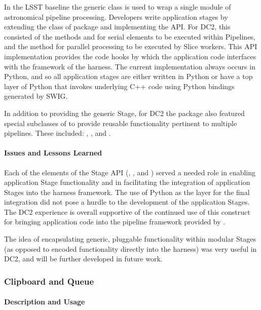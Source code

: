 In the LSST baseline the generic class  is used to wrap a single module of 
astronomical pipeline processing.  Developers write application stages by extending the 
 class of  package  and implementing the  API. 
For DC2, this  consisted of the  methods  and  for 
serial elements to be executed within Pipelines, and the
 method for parallel processing to be executed by Slice workers. 
This API implementation provides the code hooks by which the application code interfaces with 
the framework of the harness. The current  implementation always occurs in Python, and 
so all application stages are either written in Python or have a top layer of Python that 
invokes underlying C++ code using Python bindings generated by SWIG.  

In addition to providing the generic Stage, for DC2 the  package also
featured  special subclasses  of  to provide reusable functionality pertinent  to  
multiple pipelines. These included: 
, , and .

\paragraph{Issues and Lessons Learned}

Each of the elements of the Stage API (, , and  ) 
served a needed role in enabling application Stage functionality and in facilitating the
integration of application Stages into the harness framework. The use of Python as the layer for
the final integration did not pose a hurdle to the development of the application Stages. 
The DC2 experience is overall  supportive of the  continued use of this construct for bringing 
application code  into the  pipeline  framework provided by . 


The idea of encapsulating generic, pluggable  functionality within modular Stages (as opposed
to encoded functionality directly into the harness)  was very useful in DC2, 
and will be further developed in future work.



\subsubsection{Clipboard and Queue}

\paragraph{Description and Usage}

